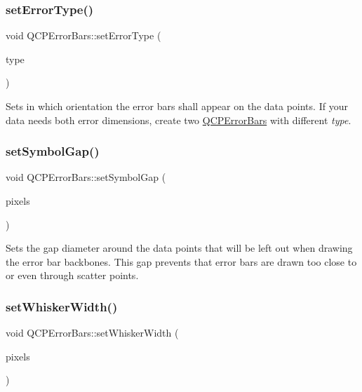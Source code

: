 \subsubsection{\texorpdfstring{set\+Error\+Type()}{setErrorType()}}
{\footnotesize\ttfamily void Q\+C\+P\+Error\+Bars\+::set\+Error\+Type (\begin{DoxyParamCaption}\item[{\hyperlink{classQCPErrorBars_a95f0220f11a72648b96480a85ce26474}{Error\+Type}}]{type }\end{DoxyParamCaption})}

Sets in which orientation the error bars shall appear on the data points. If your data needs both error dimensions, create two \hyperlink{classQCPErrorBars}{Q\+C\+P\+Error\+Bars} with different {\itshape type}. \mbox{\label{classQCPErrorBars_a280ee8d863d8a2630c309701d019b3de}} 
\subsubsection{\texorpdfstring{set\+Symbol\+Gap()}{setSymbolGap()}}
{\footnotesize\ttfamily void Q\+C\+P\+Error\+Bars\+::set\+Symbol\+Gap (\begin{DoxyParamCaption}\item[{double}]{pixels }\end{DoxyParamCaption})}

Sets the gap diameter around the data points that will be left out when drawing the error bar backbones. This gap prevents that error bars are drawn too close to or even through scatter points. \mbox{\label{classQCPErrorBars_ad05f6ff9e46c6047f1cd2459744b7b59}} 
\subsubsection{\texorpdfstring{set\+Whisker\+Width()}{setWhiskerWidth()}}
{\footnotesize\ttfamily void Q\+C\+P\+Error\+Bars\+::set\+Whisker\+Width (\begin{DoxyParamCaption}\item[{double}]{pixels }\end{DoxyParamCaption})}

